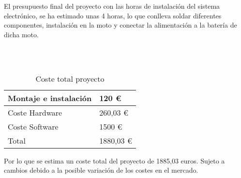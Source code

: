 	El presupuesto final del proyecto con las horas de instalación del sistema electrónico, se ha estimado unas 4 horas, lo que conlleva soldar diferentes componentes, instalación en la moto y conectar la alimentación a la batería de dicha moto.
	
	\
	\\
	\	
	
	\begin{table}[H]
		\centering
		\begin{tabular}{p{7cm} p{4cm}}
			\hline
			Montaje e instalación & 120 \euro \\
			\hline
			Coste Hardware & 260,03 \euro \\
			\hline
			Coste Software & 1500 \euro \\
			\hline \hline
			Total & 1880,03 \euro \\
			\hline
		\end{tabular}
		\caption{Coste total proyecto}
		\label{tabla:LibreriasMota}
	\end{table}
	
	Por lo que se estima un coste total del proyecto de 1885,03 euros. Sujeto a cambios debido a la posible variación de los costes en el mercado.
	
	\newpage
	$\ $